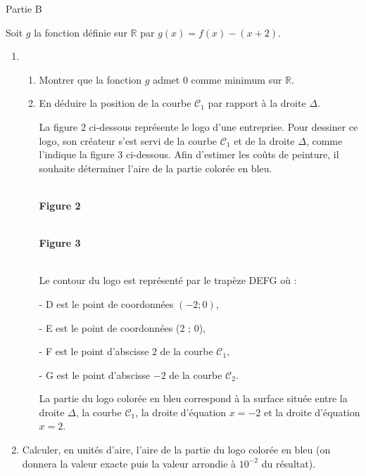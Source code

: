 \begin{h3}Partie B\end{h3}
Soit $g$ la fonction définie sur $\mathbb{R}$ par $g\left(x\right)=f\left(x\right)-\left(x+2\right)$.
\begin{enumerate}
     \item
     \begin{enumerate}
          \item
          Montrer que la fonction $g$ admet $0$ comme minimum sur $\mathbb{R}$.
          \item
          En déduire la position de la courbe $\mathscr C_{1}$ par rapport à la droite $\Delta $.
          \par
          La figure 2 ci-dessous représente le logo d'une entreprise. Pour dessiner ce logo, son créateur s'est servi de la courbe $\mathscr C_{1}$ et de la droite $\Delta $, comme l'indique la figure 3 ci-dessous. Afin d'estimer les coûts de peinture, il souhaite déterminer l'aire de la partie colorée en bleu.

\begin{center}
\\ \textbf{Figure 2}
\end{center}
\bigskip
\begin{center}
\\ \textbf{Figure 3}
\end{center}
\\

          Le contour du logo est représenté par le trapèze DEFG où :
          \par
          - D est le point de coordonnées $\left(-2 ; 0\right)$,
          \par
          - E est le point de coordonnées (2 ; 0),
          \par
          - F est le point d'abscisse 2 de la courbe $\mathscr C_{1}$,
          \par
          - G est le point d'abscisse $-2$ de la courbe $\mathscr C_{2}$.
          \par
     La partie du logo colorée en bleu correspond à la surface située entre la droite $\Delta $, la courbe $\mathscr C_{1}$, la droite d'équation $x =-2$ et la droite d'équation $x=2$.\end{enumerate}
     \item
Calculer, en unités d'aire, l'aire de la partie du logo colorée en bleu (on donnera la valeur exacte puis la valeur arrondie à $10^{-2}$ du résultat).\end{enumerate}
